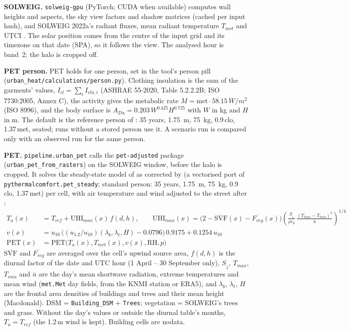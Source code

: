 \documentclass[11pt]{article}
\newcommand{\code}[1]{\texttt{#1}}
\begin{document}
\textbf{SOLWEIG.} \code{solweig-gpu} \cite{SolweigGPU} (PyTorch; CUDA when available) computes wall heights and aspects, the sky view factors and shadow matrices (cached per input hash), and SOLWEIG 2022a's radiant fluxes, mean radiant temperature $T_{mrt}$ and UTCI \cite{Lindberg2008SOLWEIG, Blazejczyk2013UTCI}. The solar position comes from the centre of the input grid and its timezone on that date (SPA), so it follows the view. The analysed hour is band~2; the halo is cropped off.

\textbf{PET person.} PET holds for one person, set in the tool's person pill (\code{urban\_heat/calculations/person.py}). Clothing insulation is the sum of the garments' values, $I_{cl} = \sum_i I_{clu,i}$ (ASHRAE 55-2020, Table 5.2.2.2B; ISO 7730:2005, Annex C), the activity gives the metabolic rate $M = \text{met} \cdot 58.15\,\si{W/m^2}$ (ISO 8996), and the body surface is $A_{Du} = 0.203\, W^{0.425} H^{0.725}$ \cite{DuBois1916} with $W$ in \si{kg} and $H$ in \si{m}. The default is the reference person of \cite{Hoppe1999PET}: 35 years, \SI{1.75}{m}, \SI{75}{kg}, 0.9\,clo, 1.37\,met, seated; runs without a stored person use it. A scenario run is compared only with an observed run for the same person.

\textbf{PET.} \code{pipeline.urban\_pet} calls the \code{pet-adjusted} package (\code{urban\_pet\_from\_rasters}) on the SOLWEIG window, before the halo is cropped. It solves the steady-state model of \cite{Hoppe1999PET} as corrected by \cite{Walther2018PET} (a vectorised port of \code{pythermalcomfort.pet\_steady}; standard person: 35 years, \SI{1.75}{m}, \SI{75}{kg}, 0.9\,clo, 1.37\,met) per cell, with air temperature and wind adjusted to the street after \cite{Koopmans2020PET}:
\begin{align}
  T_a(x) &= T_{ref} + \mathrm{UHI}_{max}(x)\, f(d, h), \qquad
  \mathrm{UHI}_{max}(x) = \big(2 - \overline{\mathrm{SVF}}(x) - \overline{F_{veg}}(x)\big)\left(\frac{S_{\downarrow}}{\rho c_p}\,\frac{(T_{max} - T_{min})^3}{\bar u}\right)^{1/4} \\
  v(x) &= u_{10}\,\big((u_{1.2}/u_{10})(\lambda_b, \lambda_t, H) - 0.0796\big)\, 0.9175 + 0.1254\, u_{10} \\
  \mathrm{PET}(x) &= \mathrm{PET}\big(T_a(x), T_{mrt}(x), v(x), \mathrm{RH}, p\big)
\end{align}
$\overline{\mathrm{SVF}}$ and $\overline{F_{veg}}$ are averaged over the cell's upwind source area, $f(d, h)$ is the diurnal factor of the date and UTC hour (1 April -- 30 September only), $S_{\downarrow}$, $T_{max}$, $T_{min}$ and $\bar u$ are the day's mean shortwave radiation, extreme temperatures and mean wind (\code{met.Met} day fields, from the KNMI station or ERA5), and $\lambda_b$, $\lambda_t$, $H$ are the frontal area densities of buildings and trees and their mean height (Macdonald). DSM = \code{Building\_DSM} + \code{Trees}; vegetation = SOLWEIG's trees and grass. Without the day's values or outside the diurnal table's months, $T_a = T_{ref}$ (the 1.2\,m wind is kept). Building cells are nodata.
\end{document}
